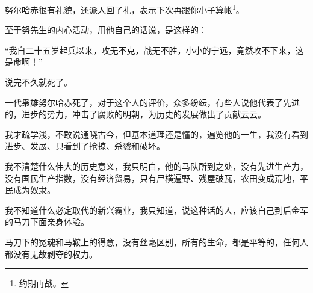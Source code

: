 \begin{multicols}{\theparacolNo}
努尔哈赤很有礼貌，还派人回了礼，表示下次再跟你小子算帐\footnote{约期再战。}。

至于努先生的内心活动，用他自己的话说，是这样的：

“我自二十五岁起兵以来，攻无不克，战无不胜，小小的宁远，竟然攻不下来，这是命啊！”

说完不久就死了。

一代枭雄努尔哈赤死了，对于这个人的评价，众多纷纭，有些人说他代表了先进的，进步的势力，冲击了腐败的明朝，为历史的发展做出了贡献云云。

我才疏学浅，不敢说通晓古今，但基本道理还是懂的，遍览他的一生，我没有看到进步、发展、只看到了抢掠、杀戮和破坏。

我不清楚什么伟大的历史意义，我只明白，他的马队所到之处，没有先进生产力，没有国民生产指数，没有经济贸易，只有尸横遍野、残屋破瓦，农田变成荒地，平民成为奴隶。

我不知道什么必定取代的新兴霸业，我只知道，说这种话的人，应该自己到后金军的马刀下面亲身体验。

马刀下的冤魂和马鞍上的得意，没有丝毫区别，所有的生命，都是平等的，任何人都没有无故剥夺的权力。
\ifnum{}
	\end{multicols}
\fi
